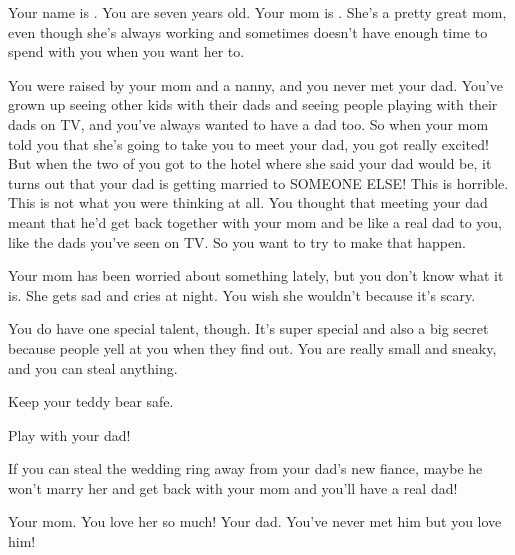 \documentclass[char]{guildcamp1}
\begin{document}
\name{\cKid{}}

Your name is \cKid{}. You are seven years old. Your mom is \cScientist{}. She's a pretty great mom, even though she's always working and sometimes doesn't have enough time to spend with you when you want her to. 

You were raised by your mom and a nanny, and you never met your dad. You've grown up seeing other kids with their dads and seeing people playing with their dads on TV, and you've always wanted to have a dad too. So when your mom told you that she's going to take you to meet your dad, you got really excited! But when the two of you got to the hotel where she said your dad would be, it turns out that your dad is getting married to SOMEONE ELSE! This is horrible. This is not what you were thinking at all. You thought that meeting your dad meant that he'd get back together with your mom and be like a real dad to you, like the dads you've seen on TV. So you want to try to make that happen. 

Your mom has been worried about something lately, but you don't know what it is. She gets sad and cries at night. You wish she wouldn't because it's scary.

You do have one special talent, though. It's super special and also a big secret because people yell at you when they find out. You are really small and sneaky, and you can steal anything. 

\begin{itemz}[Goals]
  \item Keep your teddy bear safe.
  \item Play with your dad!
  \item If you can steal the wedding ring away from your dad's new fiance, maybe he won't marry her and get back with your mom and you'll have a real dad!
\end{itemz}


\begin{contacts}
  \contact{\cScientist{}} Your mom. You love her so much!
  \contact{\cGroomA{\MYname}} Your dad. You've never met him but you love him!
\end{contacts}
\end{document}
